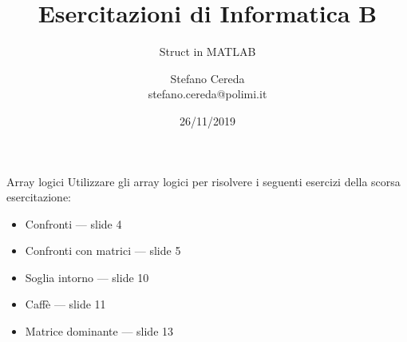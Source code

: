 \documentclass[aspectratio=169, handout]{beamer}
\title{Esercitazioni di Informatica B}
\subtitle{Struct in MATLAB}
\author{Stefano Cereda\\
stefano.cereda@polimi.it
}
\date{26/11/2019}
\institute[PoliMi]{Politecnico Milano}
\begin{document}
\begin{frame}
    \maketitle
\end{frame}

\begin{frame}{Array logici}
    Utilizzare gli array logici per risolvere i seguenti esercizi della scorsa esercitazione:
    \begin{itemize}
        \item Confronti --- slide 4
        \item Confronti con matrici --- slide 5
        \item Soglia intorno --- slide 10
        \item Caffè --- slide 11
        \item Matrice dominante --- slide 13
    \end{itemize}
\end{frame}
\end{document}
